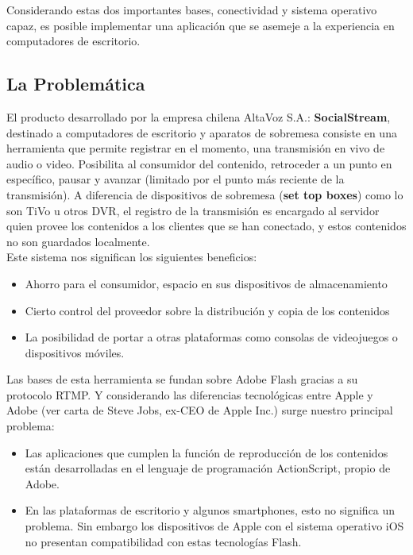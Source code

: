 Considerando estas dos importantes bases, conectividad y sistema operativo capaz, es posible implementar una aplicación que se asemeje a la experiencia en computadores de escritorio.\\

\subsection{La Problemática}
El producto desarrollado por la empresa chilena AltaVoz S.A.: \textbf{SocialStream}, destinado a computadores de escritorio y aparatos de sobremesa consiste en una herramienta que permite registrar en el momento, una transmisión en vivo de audio o video. Posibilita al consumidor del contenido, retroceder a un punto en específico, pausar  y avanzar (limitado por el punto más reciente de la transmisión). 
A diferencia de dispositivos de sobremesa (\textbf{set top boxes}) como lo son TiVo u otros DVR, el registro de la transmisión es encargado al servidor quien provee los contenidos a los clientes que se han conectado, y estos contenidos no son guardados localmente. \\

Este sistema nos significan los siguientes beneficios: 
\begin{itemize}
\item Ahorro para el consumidor, espacio en sus dispositivos de almacenamiento
\item Cierto control del proveedor sobre la distribución  y copia de los contenidos
\item La posibilidad de portar a otras plataformas como consolas de videojuegos o dispositivos móviles.
\end{itemize}

Las bases de esta herramienta se fundan sobre Adobe Flash gracias a su protocolo RTMP. Y considerando las diferencias tecnológicas entre Apple y Adobe (ver \cite{sota:steve-flash} carta de Steve Jobs, ex-CEO de Apple Inc.) surge nuestro principal problema:

\begin{itemize}
\item Las aplicaciones que cumplen la función de reproducción de los contenidos están desarrolladas en el lenguaje de programación ActionScript, propio de Adobe.
\item En las plataformas de escritorio y algunos smartphones, esto no significa un problema. Sin embargo los dispositivos de Apple con el sistema operativo iOS no presentan compatibilidad con estas tecnologías Flash.
\end{itemize}

